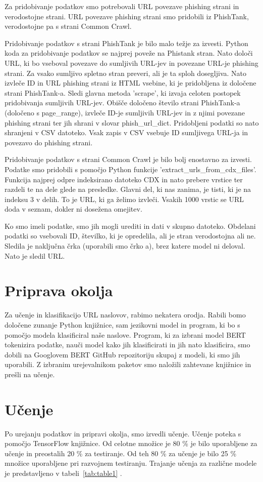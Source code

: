 \documentclass[sigconf,nonacm]{acmart}
\begin{document}
Za pridobivanje podatkov smo potrebovali URL povezave phishing strani in verodostojne strani. URL povezave phishing strani smo pridobili iz PhishTank, verodostojne pa s strani Common Crawl.

Pridobivanje podatkov s strani PhishTank je bilo malo težje za izvesti. Python koda za pridobivanje podatkov se najprej poveže na Phistank stran. Nato določi URL, ki bo vseboval povezave do sumljivih URL-jev in povezane URL-je phishing strani. Za vsako sumljivo spletno stran preveri, ali je ta sploh dosegljiva. Nato izvleče ID in URL phishing strani iz HTML vsebine, ki je pridobljena iz določene strani PhishTank-a. Sledi glavna metoda 'scrape', ki izvaja celoten postopek pridobivanja sumljivih URL-jev. Obišče določeno število strani PhishTank-a (določeno s page\_range), izvleče ID-je sumljivih URL-jev in z njimi povezane phishing strani ter jih shrani v slovar phish\_url\_dict. Pridobljeni podatki so nato shranjeni v CSV datoteko. Vsak zapis v CSV vsebuje ID sumljivega URL-ja in povezavo do phishing strani.

Pridobivanje podatkov s strani Common Crawl je bilo bolj enostavno za izvesti. Podatke smo pridobili s pomočjo Python funkcije 'extract\_urls\_from\_cdx\_files'. Funkcija najprej odpre indeksirano datoteko CDX in nato prebere vrstice ter razdeli te na dele glede na presledke. Glavni del, ki nas zanima, je tisti, ki je na indeksu 3 v delih. To je URL, ki ga želimo izvleči. Vsakih 1000 vrstic se URL doda v seznam, dokler ni dosežena omejitev.

Ko smo imeli podatke, smo jih mogli urediti in dati v skupno datoteko. Obdelani podatki so vsebovali ID, številko, ki je opredelila, ali je stran verodostojna ali ne. Sledila je naključna črka (uporabili smo črko a), brez katere model ni deloval. Nato je sledil URL. 

\section{Priprava okolja}
Za učenje in klasifikacijo URL naslovov, rabimo nekatera orodja. Rabili bomo določene zunanje Python knjižnice, sam jezikovni model in program, ki bo s pomočjo modela klasificiral naše naslove. Program, ki za izbrani model BERT tokenizira podatke, nauči model kako jih klasificirati in jih nato klasificira, smo dobili na Googlovem BERT GitHub repozitoriju skupaj z modeli, ki smo jih uporabili. Z izbranim urejevalnikom paketov smo naložili zahtevane knjižnice in prešli na učenje.

\section{Učenje}
Po urejanju podatkov in pripravi okolja, smo izvedli učenje. Učenje poteka s pomočjo TensorFlow knjižnice. Od celotne množice je 80 \% je bilo uporabljene za učenje in preostalih 20 \% za testiranje. Od teh 80 \% za učenje je bilo 25 \% množice uporabljene pri razvojnem testiranju. Trajanje učenja za različne modele je predstavljeno v tabeli~\ref{tab:table1} . 
\end{document}

